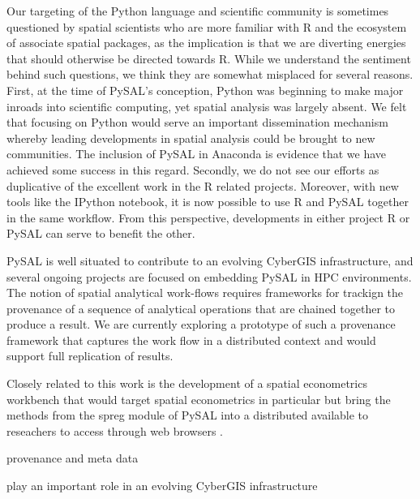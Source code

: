 \documentclass[11pt, titlepage]{article}
\begin{document}
Our targeting of the Python language and scientific community is
sometimes questioned by spatial scientists who are more familiar with R
and the ecosystem of associate spatial packages, as the implication is
that we are diverting energies that should otherwise be directed towards
R. While we understand the sentiment behind such questions, we think
they are somewhat misplaced for several reasons. First, at the time of
PySAL's conception, Python was beginning to make major inroads into
scientific computing, yet spatial analysis was largely absent. We felt
that focusing on Python would serve an important dissemination mechanism
whereby leading developments in spatial analysis could be brought to new
communities. The inclusion of PySAL in Anaconda is evidence that we have
achieved some success in this regard. Secondly, we do not see our
efforts as duplicative of the excellent work in the R related projects.
Moreover, with new tools like the IPython notebook, it is now possible
to use R and PySAL together in the same workflow. From this perspective,
developments in either project R or PySAL can serve to benefit the
other.

PySAL is well situated to contribute to an evolving CyberGIS
infrastructure, and several ongoing projects are focused on embedding
PySAL in HPC environments. The notion of spatial analytical work-flows
requires frameworks for trackign the provenance of a sequence of
analytical operations that are chained together to produce a result. We
are currently exploring a prototype of such a provenance framework that
captures the work flow in a distributed context and would support full
replication of results.

Closely related to this work is the development of a spatial
econometrics workbench \citep{Anselin:2011wt} that would target spatial econometrics in
particular but bring the methods from the spreg module of PySAL into a
distributed available to reseachers to access through web browsers .

provenance and meta data

play an important role in an evolving CyberGIS infrastructure


%

\end{document}
